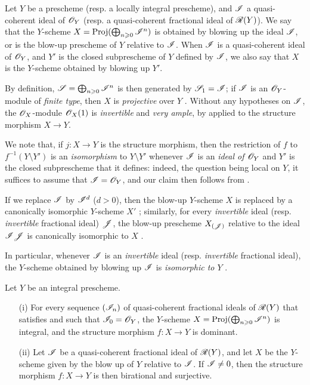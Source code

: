 \begin{definition}[8.1.3]
\label{II.8.1.3}
Let $Y$ be a prescheme (resp. a locally integral prescheme), and $\mathscr{I}$ a quasi-coherent ideal of $\mathscr{O}_Y$ (resp. a quasi-coherent fractional ideal of $\mathscr{R}(Y)$).
We say that the $Y$-scheme $X = \operatorname{Proj}(\bigoplus_{n\geqslant0}\mathscr{I}^n)$ is obtained by blowing up the ideal $\mathscr{I}$, or is the blow-up prescheme of $Y$ relative to $\mathscr{I}$.
When $\mathscr{I}$ is a quasi-coherent ideal of $\mathscr{O}_Y$, and $Y'$ is the closed subprescheme of $Y$ defined by $\mathscr{I}$, we also say that $X$ is the $Y$-scheme obtained by blowing up $Y'$.
\end{definition}

By definition, $\mathscr{S} = \bigoplus_{n\geqslant0}\mathscr{I}^n$ is then generated by $\mathscr{S}_1 = \mathscr{I}$;
if $\mathscr{I}$ is an $\mathscr{O}_Y$-module of \emph{finite type}, then $X$ is \emph{projective} over $Y$ .
Without any hypotheses on $\mathscr{I}$, the $\mathscr{O}_X$-module $\mathscr{O}_X(1)$ is \emph{invertible}  and \emph{very ample}, by  applied to the structure morphism $X\to Y$.

We note that, if $j:X\to Y$ is the structure morphism, then the restriction of $f$ to $f^{-1}(Y\setminus Y')$ is an \emph{isomorphism} to $Y\setminus Y'$ whenever $\mathscr{I}$ is an \emph{ideal of $\mathscr{O}_Y$} and $Y'$ is the closed subprescheme that it defines: indeed, the question being local on $Y$, it suffices to assume that $\mathscr{I} = \mathscr{O}_Y$, and our claim then follows from .

If we replace $\mathscr{I}$ by $\mathscr{I}^d$ ($d>0$), then the blow-up $Y$-scheme $X$ is replaced by a canonically isomorphic $Y$-scheme $X'$ ;
similarly, for every \emph{invertible} ideal (resp. \emph{invertible} fractional ideal) $\mathscr{J}$, the blow-up prescheme $X_{(\mathscr{J})}$ relative to the ideal $\mathscr{I}\mathscr{J}$ is canonically isomorphic to $X$ .

In particular, whenever $\mathscr{I}$ is an \emph{invertible} ideal (resp. \emph{invertible} fractional ideal), the $Y$-scheme obtained by blowing up $\mathscr{I}$ is \emph{isomorphic to $Y$} .

\begin{proposition}[8.1.3]
\label{II.8.1.4}
Let $Y$ be an integral prescheme.
\begin{enumerate}
    \item[\rm{(i)}] For every sequence $(\mathscr{I}_n)$ of quasi-coherent fractional ideals of $\mathscr{R}(Y)$ that satisfies 
        and such that $\mathscr{I}_0 = \mathscr{O}_Y$, the $Y$-scheme $X=\operatorname{Proj}(\bigoplus_{n\geqslant0}\mathscr{I}^n)$ is integral, and the structure morphism $f:X\to Y$ is dominant.
    \item[\rm{(ii)}] Let $\mathscr{I}$ be a quasi-coherent fractional ideal of $\mathscr{R}(Y)$, and let $X$ be the $Y$-scheme given by the blow up of $Y$ relative to $\mathscr{I}$.
        If $\mathscr{I} \neq 0$, then the structure morphism $f:X\to Y$ is then birational and surjective.
\end{enumerate}
\end{proposition}

